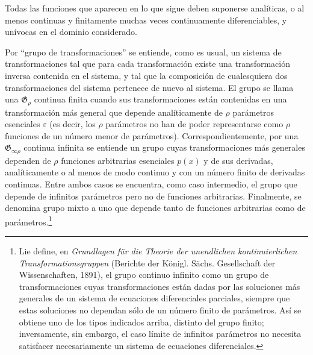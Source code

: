 \documentclass[11pt]{article}
\newcommand{\eps}{\varepsilon}
\providecommand{\G}{\mathfrak G}
\begin{document}
Todas las funciones que aparecen en lo que sigue deben suponerse analíticas, o al menos continuas y finitamente muchas veces continuamente diferenciables, y unívocas en el dominio considerado.

Por ``grupo de transformaciones'' se entiende, como es usual, un sistema de transformaciones tal que para cada transformación existe una transformación inversa contenida en el sistema, y tal que la composición de cualesquiera dos transformaciones del sistema pertenece de nuevo al sistema. El grupo se llama una \(\G_\rho\) continua finita cuando sus transformaciones están contenidas en una transformación más general que depende analíticamente de \(\rho\) parámetros esenciales \(\eps\) (es decir, los \(\rho\) parámetros no han de poder representarse como \(\rho\) funciones de un número menor de parámetros). Correspondientemente, por una \(\G_{\infty\rho}\) continua infinita se entiende un grupo cuyas transformaciones más generales dependen de \(\rho\) funciones arbitrarias esenciales \(p(x)\) y de sus derivadas, analíticamente o al menos de modo continuo y con un número finito de derivadas continuas. Entre ambos casos se encuentra, como caso intermedio, el grupo que depende de infinitos parámetros pero no de funciones arbitrarias. Finalmente, se denomina grupo mixto a uno que depende tanto de funciones arbitrarias como de parámetros.\footnote{Lie define, en \emph{Grundlagen für die Theorie der unendlichen kontinuierlichen Transformationsgruppen} (Berichte der Königl. Sächs. Gesellschaft der Wissenschaften, 1891), el grupo continuo infinito como un grupo de transformaciones cuyas transformaciones están dadas por las soluciones más generales de un sistema de ecuaciones diferenciales parciales, siempre que estas soluciones no dependan sólo de un número finito de parámetros. Así se obtiene uno de los tipos indicados arriba, distinto del grupo finito; inversamente, sin embargo, el caso límite de infinitos parámetros no necesita satisfacer necesariamente un sistema de ecuaciones diferenciales.}
\end{document}
